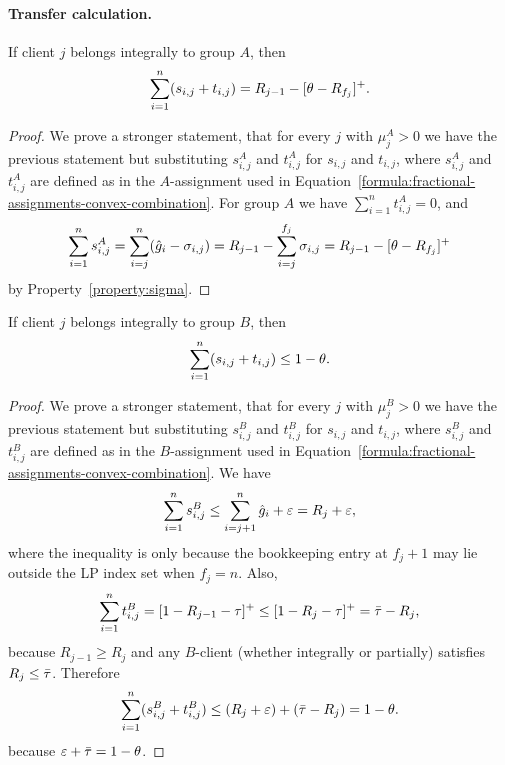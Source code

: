 \paragraph{Transfer calculation.}

\begin{lemma}
    \label{lem:tran-A}
    If client $j$ belongs integrally to group $A$, then
    \begin{equation*}
        \sum_{i=1}^n (s_{i,j} + t_{i,j}) = R_{j-1} - [\theta - R_{f_j}]^+.
    \end{equation*}
\end{lemma}
\begin{proof}
    We prove a stronger statement, that for every $j$ with $\mu_j^A > 0$ we have the previous statement but substituting $s_{i,j}^A$ and $t_{i,j}^A$ for $s_{i,j}$ and $t_{i,j}$, where $s_{i,j}^A$ and $t_{i,j}^A$ are defined as in the $A$-assignment used in Equation~\ref{formula:fractional-assignments-convex-combination}.
    For group $A$ we have $\sum_{i=1}^n t_{i,j}^A=0$, and
    \begin{equation*}
        \sum_{i=1}^n s_{i,j}^A = \sum_{i=j}^n (\hat{g}_i-\sigma_{i,j}) = R_{j-1} - \sum_{i=j}^{f_j} \sigma_{i,j}
    = R_{j-1} - [\theta - R_{f_j}]^+
    \end{equation*}
    by Property~\ref{property:sigma}.
\end{proof}

\begin{lemma}
    \label{lem:tran-B}
    If client $j$ belongs integrally to group $B$, then
    \begin{equation*}
        \sum_{i=1}^n (s_{i,j} + t_{i,j}) \leq 1-\theta.
    \end{equation*}
\end{lemma}
\begin{proof}
    We prove a stronger statement, that for every $j$ with $\mu_j^B > 0$ we have the previous statement but substituting $s_{i,j}^B$ and $t_{i,j}^B$ for $s_{i,j}$ and $t_{i,j}$, where $s_{i,j}^B$ and $t_{i,j}^B$ are defined as in the $B$-assignment used in Equation~\ref{formula:fractional-assignments-convex-combination}.
    We have
    \begin{equation*}
        \sum_{i=1}^n s_{i,j}^B \leq \sum_{i=j+1}^n \hat{g}_i + \varepsilon = R_j + \varepsilon,
    \end{equation*}
    where the inequality is only because the bookkeeping entry at $f_j+1$ may lie outside the LP index set when $f_j=n$.
    Also,
    \begin{equation*}
        \sum_{i=1}^n t_{i,j}^B = [1-R_{j-1}-\tau]^+ \leq [1-R_{j}-\tau]^+ = \bar\tau - R_j,
    \end{equation*}
    because $R_{j-1} \ge R_j$ and any $B$-client (whether integrally or partially) satisfies $R_{j} \le \bar\tau$.
    Therefore
    \begin{equation*}
        \sum_{i=1}^n (s_{i,j}^B+t_{i,j}^B) \le (R_j+\varepsilon) + (\bar\tau-R_j) = 1-\theta.
    \end{equation*}
    because $\varepsilon + \bar\tau = 1-\theta$.
\end{proof}


